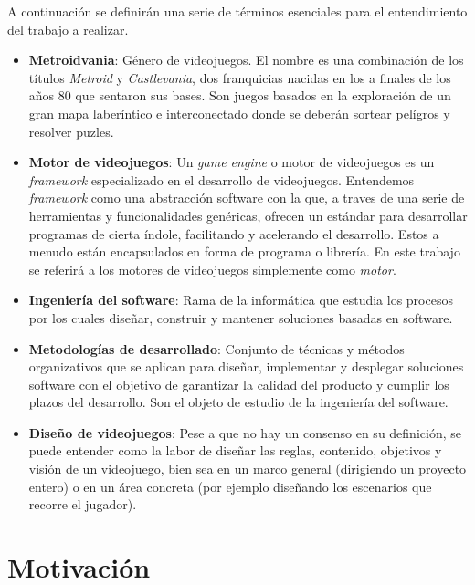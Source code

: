A continuación se definirán una serie de términos esenciales para el entendimiento del trabajo a realizar.

\begin{itemize}
    \item \textbf{Metroidvania}: Género de videojuegos. El nombre es una combinación de los títulos \textit{Metroid} y \textit{Castlevania}, dos franquicias nacidas en los a finales de los años 80 que sentaron sus bases. Son juegos basados en la exploración de un gran mapa laberíntico e interconectado donde se deberán sortear pelígros y resolver puzles.

    \item \textbf{Motor de videojuegos}: Un \textit{game engine} o motor de videojuegos es un \textit{framework} especializado en el desarrollo de videojuegos. Entendemos \textit{framework} como una abstracción software con la que, a traves de una serie de herramientas y funcionalidades genéricas, ofrecen un estándar para desarrollar programas de cierta índole, facilitando y acelerando el desarrollo. Estos a menudo están encapsulados en forma de programa o librería. En este trabajo se referirá a los motores de videojuegos simplemente como \textit{motor}.
    
    \item \textbf{Ingeniería del software}: Rama de la informática que estudia los procesos por los cuales diseñar, construir y mantener soluciones basadas en software.

    \item \textbf{Metodologías de desarrollado}: Conjunto de técnicas y métodos organizativos que se aplican para diseñar, implementar y desplegar soluciones software con el objetivo de garantizar la calidad del producto y cumplir los plazos del desarrollo. Son el objeto de estudio de la ingeniería del software.
    
    \item \textbf{Diseño de videojuegos}: Pese a que no hay un consenso en su definición, se puede entender como la labor de diseñar las reglas, contenido, objetivos y visión de un videojuego, bien sea en un marco general (dirigiendo un proyecto entero) o en un área concreta (por ejemplo diseñando los escenarios que recorre el jugador).

\end{itemize} 


\section{Motivación}

